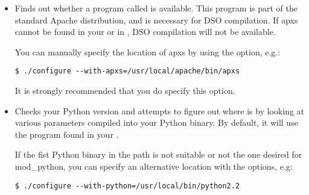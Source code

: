 \begin{itemize}

\item
{}
Finds out whether a program called  is available. This
program is part of the standard Apache distribution, and is necessary
for DSO compilation. If apxs cannot be found in your  or in
, DSO compilation will not be available.

You can manually specify the location of apxs by using the
 option, e.g.:

\begin{verbatim}
$ ./configure --with-apxs=/usr/local/apache/bin/apxs 	
\end{verbatim}

It is strongly recommended that you do specify this option.



\item
{}
Checks your Python version and attempts to figure out where
 is by looking at various parameters compiled into
your Python binary. By default, it will use the 
program found in your .

 If the fist Python
binary in the path is not suitable or not the one desired for
mod_python, you can specify an alternative location with the
 options, e.g:

\begin{verbatim}
$ ./configure --with-python=/usr/local/bin/python2.2
\end{verbatim}                      

\end{itemize}

